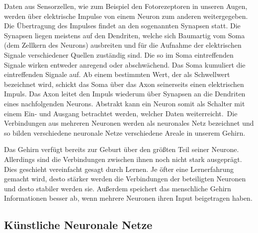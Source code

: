 Daten aus Sensorzellen, wie zum Beispiel den Fotorezeptoren in unseren Augen, werden über elektrische Impulse von einem Neuron zum anderen weitergegeben. Die Übertragung des Impulses findet an den sogenannten Synapsen statt. Die Synapsen liegen meistens auf den Dendriten, welche sich Baumartig vom Soma (dem Zellkern des Neurons) ausbreiten und für die Aufnahme der elektrischen Signale verschiedener Quellen zuständig sind. Die so im Soma eintreffenden Signale wirken entweder anregend oder abschwächend. Das Soma kumuliert die eintreffenden Signale auf. Ab einem bestimmten Wert, der als Schwellwert bezeichnet wird, schickt das Soma über das Axon seinerseits einen elektrischen Impuls. Das Axon leitet den Impuls wiederum über Synapsen an die Dendriten eines nachfolgenden Neurons. Abstrakt kann ein Neuron somit als Schalter mit einem Ein- und Ausgang betrachtet werden, welcher Daten weiterreicht.\, Die Verbindungen aus mehreren Neuronen werden als neuronales Netz bezeichnet und so bilden verschiedene neuronale Netze verschiedene Areale in unserem Gehirn. 

Das Gehirn verfügt bereits zur Geburt über den größten Teil seiner Neurone. Allerdings sind die Verbindungen zwischen ihnen noch nicht stark ausgeprägt. Dies geschieht vereinfacht gesagt durch Lernen. Je öfter eine Lernerfahrung gemacht wird, desto stärker werden die Verbindungen der beteiligten Neuronen und desto stabiler werden sie. Außerdem speichert das menschliche Gehirn Informationen besser ab, wenn mehrere Neuronen ihren Input beigetragen haben.

\subsection{Künstliche Neuronale Netze}\label{sec:einf_neuro}






